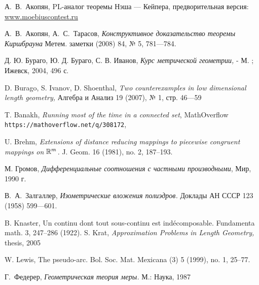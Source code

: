 \documentclass[oneside,a4paper]{article}
\begin{document}
\begin{thebibliography}{52} 
 А.~В.~Акопян, {PL-аналог теоремы Нэша --- Кейпера}, предворительная версия:
\href{http://www.moebiuscontest.ru/files/2007/akopyan.pdf}{www.moebiuscontest.ru}

А.~В.~Акопян, А.~С.~Тарасов,
\textit{Конструктивное доказательство теоремы Киршбрауна} Метем. заметки (2008) 84, № 5, 781---784. 

 Д. Ю. Бураго, Ю. Д. Бураго, С. В. Иванов, \textit{Курс метрической геометрии,} - М. ; Ижевск, 2004, 496 с.

  D. Burago, S. Ivanov, D. Shoenthal, \textit{Two counterexamples in low dimensional length geometry,}
Алгебра и Анализ  19 (2007), № 1, стр. 46---59

 T. Banakh,  \textit{Running most of the time in a connected set},  MathOverflow   \texttt{https://mathoverflow.net/q/308172},

 U. Brehm, \textit{Extensions of distance reducing mappings to piecewise congruent mappings on $\mathbb{R}^m$.}  J. Geom.  16  (1981), no. 2, 187--193.

 М. Громов,  \textit{Дифференциальные соотношения с частными производными}, Мир, 1990 г.

 В.~А.~Залгаллер,
\textit{Изометрические вложения полиэдров.}
Доклады АН СССР 123 (1958) 599---601.

 B. Knaster,  Un continu dont tout sous-continu est ind\'ecomposable. Fundamenta math. 3, 247--286 (1922).
 S. Krat,  \textit{Approximation Problems in Length Geometry,} thesis, 2005

 W. Lewis,  The pseudo-arc. Bol. Soc. Mat. Mexicana (3) 5 (1999), no. 1, 25--77.

 Г.~Федерер, \textit{Геометрическая теория меры.} М.: Наука, 1987
\end{thebibliography}
\end{document}
